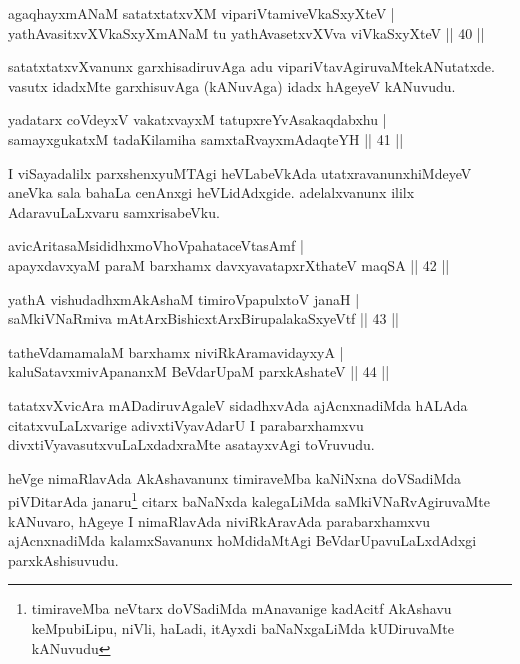 \begin{shl}
agaqhayxmANaM satatxtatxvXM vipariVtamiveVkaSxyXteV  |\\
yathAvasitxvXVkaSxyXmANaM tu yathAvasetxvXVva viVkaSxyXteV \hfill || 40 ||
\end{shl}

\begin{artha}
satatxtatxvXvanunx garxhisadiruvAga adu vipariVtavAgiruvaMte\break kANutatxde.  vasutx idadxMte garxhisuvAga (kANuvAga) idadx hAgeyeV kANuvudu.
\end{artha}

\begin{shl}
yadatarx coVdeyxV vakatxvayxM tatupxreYvAsakaqdabxhu |\\
samayxgukatxM tadaKilamiha samxtaRvayxmAdaqteYH \hfill || 41 ||
\end{shl}

\begin{artha}
I viSayadalilx parxshenxyuMTAgi heVLabeVkAda utatxravanunx\break hiMdeyeV aneVka sala bahaLa cenAnxgi heVLidAdxgide. adelalxvanunx ililx AdaravuLaLxvaru samxrisabeVku.
\end{artha}


\begin{shl}
avicAritasaMsididhxmoVhoVpahataceVtasAmf |\\
apayxdavxyaM paraM barxhamx davxyavatapxrXthateV maqSA \hfill || 42 ||
\end{shl}

\begin{shl}
yathA vishudadhxmAkAshaM timiroVpapulxtoV janaH |\\
saMkiVNaRmiva mAtArxBishicxtArxBirupalakaSxyeVtf \hfill || 43 ||
\end{shl}

\begin{shl}
tatheVdamamalaM barxhamx niviRkAramavidayxyA |\\
kaluSatavxmivA\s \s pananxM BeVdarUpaM parxkAshateV \hfill || 44 ||
\end{shl}

\begin{artha}%
tatatxvXvicAra mADadiruvAgaleV sidadhxvAda ajAcnxnadiMda hALAda citatxvuLaLxvarige adivxtiVyavAdarU I parabarxhamxvu divxtiVya\break vasutxvuLaLxdadxraMte asatayxvAgi toVruvudu.

heVge nimaRlavAda AkAshavanunx timiraveMba kaNiNxna doVSadiMda piVDitarAda janaru\footnote{timiraveMba neVtarx doVSadiMda mAnavanige kadAcitf AkAshavu keMpubiLipu, niVli, haLadi, itAyxdi baNaNxgaLiMda kUDiruvaMte kANuvudu} citarx baNaNxda kalegaLiMda saMkiVNaRvAgiruvaMte kANuvaro, hAgeye I nimaRlavAda niviRkAravAda parabarxhamxvu ajAcnxnadiMda kalamxSavanunx hoMdidaMtAgi BeVdarUpavuLaLxdAdxgi parxkAshisuvudu.
\end{artha}

